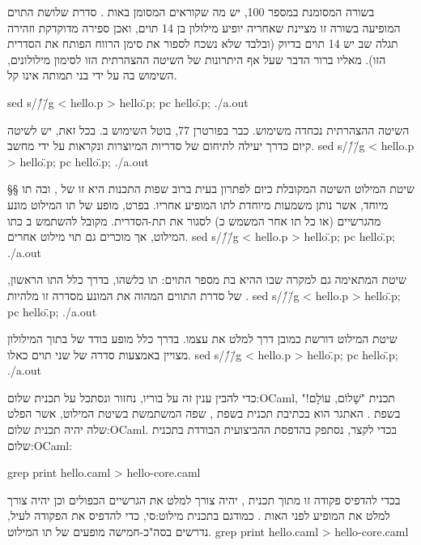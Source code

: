 בשורה המסומנת במספר 100, יש מה שקוראים  המסומן באות . סדרת
שלושת התוים  המופיעה בשורה זו מציינת שאחריה יופיע מילולון בן 14 תוים,
ואכן ספירה מדוקדקת וזהירה תגלה שב
{\let\ttfamily=\listingsfont{}}
יש 14 תוים בדיוק (ובלבד שלא נשכח לספור את סימן הרווח הפותח את הסדרית הזו).
מאליו ברור הדבר שעל אף היתרונות של השיטה ההצהרתית הזו לסימון מילולונים, השימוש
בה על ידי בני תמותה אינו קל.

sed s/\'/\"/g < hello.p > hello\".p; pc hello\".p; ./a.out
\END

השיטה ההצהרתית נכחדה משימוש. כבר בפורטרן 77, בוטל השימוש
ב.
בכל זאת, יש לשיטה קיום כדרך יעילה לתיחום של סדריות המיוצרות ונקראות על ידי מחשב.
sed s/\'/\"/g < hello.p > hello\".p; pc hello\".p; ./a.out
\END

§§ שיטת המילוט
השיטה המקובלת כיום לפתרון בעית  ברוב שפות התכנות היא זו של
, ובה תו מיוחד,  אשר נותן משמעות מיוחדת לתו המופיע אחריו.
בפרט, מופע של תו המילוט מונע מהגרשיים (או כל תו אחר המשמש כ) לסגור את
תת-הסדרית. מקובל להשתמש ב כתו המילוט, אך מוכרים גם תוי מילוט
אחרים.
sed s/\'/\"/g < hello.p > hello\".p; pc hello\".p; ./a.out
\END

שיטת ה מתאימה גם למקרה שבו ה היא בת מספר התוים:  תו כלשהו, בדרך
כלל התו הראשון, של סדרת התווים המהוה את ה מונע מסדרה זו מלהיות .
sed s/\'/\"/g < hello.p > hello\".p; pc hello\".p; ./a.out
\END

שיטת המילוט דורשת כמובן דרך למלט את  עצמו. בדרך כלל
מופע בודד של  בתוך המילולון מצויין באמצעות סדרה של
שני תוים כאלו.
sed s/\'/\"/g < hello.p > hello\".p; pc hello\".p; ./a.out
\END

כדי להבין ענין זה על בוריו, נחזור ונסתכל על  תכנית שלום:OCaml, תכנית
"שָׁלוֹם, עוֹלָם!" בשפת . האתגר הוא בכתיבת תכנית בשפת , שפה המשתמשת
בשיטת המילוט, אשר הפלט שלה יהיה  תכנית שלום:OCaml. בכדי לקצר, נסתפק בהדפסת
ה הביצועית הבודדת ב תכנית שלום:OCaml{}:


\bash
grep print hello.caml > hello-core.caml
\END

\begin{קוד}
\setLTR
\lstset{language=[Objective]Caml,style=display}

\end{קוד}

בכדי להדפיס פקודה זו מתוך תכנית , יהיה צורך למלט את הגרשיים הכפולים וכן
יהיה צורך למלט את  המופיע לפני האות .
כמודגם ב תכנית מילוט:סי, כדי להדפיס את הפקודה לעיל, נדרשים בסה"כ-חמישה
מופעים של תו המילוט.
\bash
grep print hello.caml > hello-core.caml
\END

